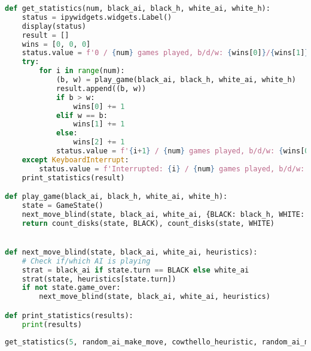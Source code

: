 \begin{lstlisting}[language=Python]
def get_statistics(num, black_ai, black_h, white_ai, white_h):
    status = ipywidgets.widgets.Label()
    display(status)
    result = []
    wins = [0, 0, 0]
    status.value = f'0 / {num} games played, b/d/w: {wins[0]}/{wins[1]}/{wins[2]}'
    try:
        for i in range(num):
            (b, w) = play_game(black_ai, black_h, white_ai, white_h)
            result.append((b, w))
            if b > w:
                wins[0] += 1
            elif w == b:
                wins[1] += 1
            else:
                wins[2] += 1
            status.value = f'{i+1} / {num} games played, b/d/w: {wins[0]}/{wins[1]}/{wins[2]}'
    except KeyboardInterrupt:
        status.value = f'Interrupted: {i} / {num} games played, b/d/w: {wins[0]}/{wins[1]}/{wins[2]}'
    print_statistics(result)

def play_game(black_ai, black_h, white_ai, white_h):
    state = GameState()
    next_move_blind(state, black_ai, white_ai, {BLACK: black_h, WHITE: white_h})
    return count_disks(state, BLACK), count_disks(state, WHITE)


def next_move_blind(state, black_ai, white_ai, heuristics):
    # Check if/which AI is playing
    strat = black_ai if state.turn == BLACK else white_ai
    strat(state, heuristics[state.turn])
    if not state.game_over:
        next_move_blind(state, black_ai, white_ai, heuristics)

def print_statistics(results):
    print(results)
\end{lstlisting}

\begin{lstlisting}[language=Python]
get_statistics(5, random_ai_make_move, cowthello_heuristic, random_ai_make_move, cowthello_heuristic)
\end{lstlisting}
